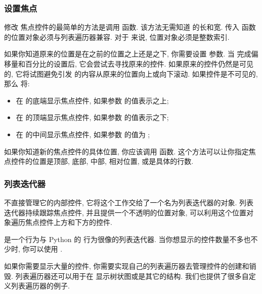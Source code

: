 \subsubsection{设置焦点}
修改  焦点控件的最简单的方法是调用  函数. 该方法无需知道  的长和宽. 传入  函数的位置对象必须与列表遍历器兼容. 对于  来说, 位置对象必须是整数索引.

\indent 如果你知道原来的位置是在之前的位置之上还是之下, 你需要设置  参数. 当  完成偏移量和百分比的设置后, 它会尝试去寻找原来的控件. 如果原来的控件仍然是可见的, 它将试图避免引发  的内容从原来的位置向上或向下滚动. 如果控件是不可见的, 那么  将:%
%
\begin{itemize}
  \item 在  的底端显示焦点控件, 如果参数  的值表示之上;
  \item 在  的顶端显示焦点控件, 如果参数  的值表示之下;
  \item 在  的中间显示焦点控件, 如果参数  的值为 ;
\end{itemize}%
%
如果你知道新的焦点控件的具体位置, 你应该调用  函数. 这个方法可以让你指定焦点控件的位置是顶部, 底部, 中部, 相对位置, 或是具体的行数.

\subsubsection{列表迭代器}
\indent{} 不直接管理它的内部控件, 它将这个工作交给了一个名为列表迭代器的对象. 列表迭代器持续跟踪焦点控件, 并且提供一个不透明的位置对象,  可以利用这个位置对象遍历焦点控件上方和下方的控件.

\indent{} 是一个行为与 Python 的  行为很像的列表迭代器. 当你想显示的控件数量不多也不少时, 你可以使用 .

如果你需要显示大量的控件, 你需要实现自己的列表遍历器去管理控件的创建和销毁. 列表遍历器还可以用于在  显示树状图或是其它的结构. 我们也提供了很多自定义列表遍历器的例子.